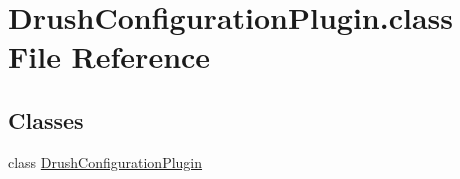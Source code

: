 \hypertarget{DrushConfigurationPlugin_8class}{\section{Drush\-Configuration\-Plugin.\-class File Reference}
\label{DrushConfigurationPlugin_8class}
}
\subsection*{Classes}
\begin{DoxyCompactItemize}
\item 
class \hyperlink{classDrushConfigurationPlugin}{Drush\-Configuration\-Plugin}
\end{DoxyCompactItemize}
